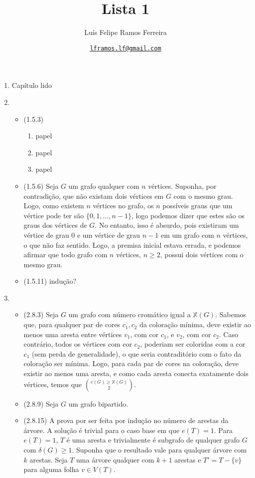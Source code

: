 \documentclass{article}
\title{Lista 1}
\author{Luís Felipe Ramos Ferreira}
\date{\href{mailto:lframos.lf@gmail.com}{\texttt{lframos.lf@gmail.com}}
}
\begin{document}
\maketitle

\begin{enumerate}

	\item Capítulo lido
	\item
	      \begin{itemize}
		      \item (1.5.3)
		            \begin{enumerate}
			            \item papel
			            \item papel
			            \item papel
		            \end{enumerate}
		      \item (1.5.6) Seja \(G\) um grafo qualquer com \(n\) vértices. Suponha, por contradição, que não existam dois vértices em \(G\) com o mesmo grau. Logo, como existem \(n\) vértices no grafo, os \(n\) possíveis graus que um vértice pode ter são \(\{0, 1, \dots, n-1\}\), logo podemos dizer que estes são os graus dos vértices de \(G\). No entanto, isso é absurdo, pois existiram um vértice de grau 0 e um vértice de grau \(n-1\) em um grafo com \(n\) vértices, o que não faz sentido. Logo, a premisa inicial estava errada, e podemos afirmar que todo grafo com \(n\) vértices, \(n \geq 2\), possui dois vértices com o mesmo grau.
		      \item (1.5.11) indução?
	      \end{itemize}
	\item \begin{itemize}
		      \item (2.8.3) Seja \(G\) um grafo com número cromático igual a \(\mathbb{X}(G)\). Sabemos que, para qualquer par de cores \(c_1, c_2\) da coloração mínima, deve existir ao menos uma aresta entre vértices \(v_1\), com cor \(c_1\), e \(v_2\), com cor \(c_2\). Caso contrário, todos os vértices com cor \(c_2\), poderiam ser coloridas com a cor \(c_1\) (sem perda de generalidade), o que seria contraditório com o fato da coloração ser mínima. Logo, para cada par de cores na coloração, deve existir ao menos uma aresta, e como cada aresta conecta exatamente dois vértices, temos que \(e(G) \ge \mathbb{X}(G) \choose 2\).
		      \item (2.8.9) Seja \(G\) um grafo bipartido.
		      \item (2.8.15) A prova por ser feita por indução no número de arestas da árvore. A solução é trivial para o caso base em que \(e(T) = 1\). Para \(e(T) = 1\), \(T\) é uma aresta e trivialmente é subgrafo de qualquer grafo \(G\) com \(\delta(G) \geq 1\). Suponha que o resultado vale para qualquer árvore com \(k\) arestas. Seja \(T\) uma árvore qualquer com \(k + 1\) arestas e \(T' = T - \{v\}\) para alguma folha \(v \in V(T)\).
	      \end{itemize}


\end{enumerate}
\end{document}
